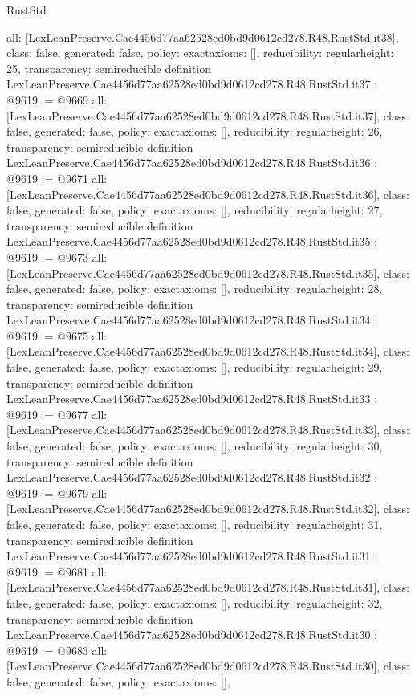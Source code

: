 \begin{lexlean}{RustStd}
\begin{coremodule}
{  all: [LexLeanPreserve.Cae4456d77aa62528ed0bd9d0612cd278.R48.RustStd.it38],
  class: false,
  generated: false,
  policy: exact{axioms: []},
  reducibility: regular{height: 25},
  transparency: semireducible
}
definition LexLeanPreserve.Cae4456d77aa62528ed0bd9d0612cd278.R48.RustStd.it37 : @9619 := @9669 {
  all: [LexLeanPreserve.Cae4456d77aa62528ed0bd9d0612cd278.R48.RustStd.it37],
  class: false,
  generated: false,
  policy: exact{axioms: []},
  reducibility: regular{height: 26},
  transparency: semireducible
}
definition LexLeanPreserve.Cae4456d77aa62528ed0bd9d0612cd278.R48.RustStd.it36 : @9619 := @9671 {
  all: [LexLeanPreserve.Cae4456d77aa62528ed0bd9d0612cd278.R48.RustStd.it36],
  class: false,
  generated: false,
  policy: exact{axioms: []},
  reducibility: regular{height: 27},
  transparency: semireducible
}
definition LexLeanPreserve.Cae4456d77aa62528ed0bd9d0612cd278.R48.RustStd.it35 : @9619 := @9673 {
  all: [LexLeanPreserve.Cae4456d77aa62528ed0bd9d0612cd278.R48.RustStd.it35],
  class: false,
  generated: false,
  policy: exact{axioms: []},
  reducibility: regular{height: 28},
  transparency: semireducible
}
definition LexLeanPreserve.Cae4456d77aa62528ed0bd9d0612cd278.R48.RustStd.it34 : @9619 := @9675 {
  all: [LexLeanPreserve.Cae4456d77aa62528ed0bd9d0612cd278.R48.RustStd.it34],
  class: false,
  generated: false,
  policy: exact{axioms: []},
  reducibility: regular{height: 29},
  transparency: semireducible
}
definition LexLeanPreserve.Cae4456d77aa62528ed0bd9d0612cd278.R48.RustStd.it33 : @9619 := @9677 {
  all: [LexLeanPreserve.Cae4456d77aa62528ed0bd9d0612cd278.R48.RustStd.it33],
  class: false,
  generated: false,
  policy: exact{axioms: []},
  reducibility: regular{height: 30},
  transparency: semireducible
}
definition LexLeanPreserve.Cae4456d77aa62528ed0bd9d0612cd278.R48.RustStd.it32 : @9619 := @9679 {
  all: [LexLeanPreserve.Cae4456d77aa62528ed0bd9d0612cd278.R48.RustStd.it32],
  class: false,
  generated: false,
  policy: exact{axioms: []},
  reducibility: regular{height: 31},
  transparency: semireducible
}
definition LexLeanPreserve.Cae4456d77aa62528ed0bd9d0612cd278.R48.RustStd.it31 : @9619 := @9681 {
  all: [LexLeanPreserve.Cae4456d77aa62528ed0bd9d0612cd278.R48.RustStd.it31],
  class: false,
  generated: false,
  policy: exact{axioms: []},
  reducibility: regular{height: 32},
  transparency: semireducible
}
definition LexLeanPreserve.Cae4456d77aa62528ed0bd9d0612cd278.R48.RustStd.it30 : @9619 := @9683 {
  all: [LexLeanPreserve.Cae4456d77aa62528ed0bd9d0612cd278.R48.RustStd.it30],
  class: false,
  generated: false,
  policy: exact{axioms: []},
}
\end{coremodule}
\end{lexlean}
